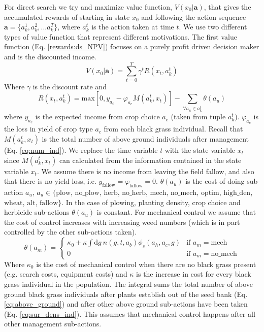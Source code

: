 \documentclass[12pt, a4paper]{article}
\begin{document}
For direct search we try and maximize value function, $V(x_0|\mathbf{a})$, that gives the accumulated rewards of starting in state $x_0$ and following the action sequence $\mathbf{a} = \{a_k^1, a_k^2, ... a_k^T\}$, where $a_k^t$ is the action taken at time $t$. We use two different types of value function that represent different motivations. The first value function (Eq. \ref{rewards:ds_NPV}) focuses on a purely profit driven decision maker and is the discounted income. 
\begin{equation}\label{rewards:ds_NPV}
	V(x_0|\mathbf{a}) = \sum_{t = 0}^{T} \gamma^t R(x_t, a_k^t) 
\end{equation}
Where $\gamma$ is the discount rate and 
\begin{equation}\label{rewards:immediate}
	R(x_t, a_k^t) = \text{max}\left[0, y_{a_c} - \varphi_{a_c} M(a_k^t, x_t)\right] - \sum_{\forall a_u \in a_k^t} \theta(a_u)  
\end{equation}
where $y_{a_c}$ is the expected income from crop choice $a_c$ (taken from tuple $a_k^t$). $\varphi_{a_c}$ is the loss in yield of crop type $a_c$ from each black grass individual. Recall that $M(a_k^t, x_t)$ is the total number of above ground individuals after management (Eq. \ref{eq:num_ind}). We replace the time variable $t$ with the state variable $x_t$ since $M(a_k^t, x_t)$ can calculated from the information contained in the state variable $x_t$. We assume there is no income from leaving the field fallow, and also that there is no yield loss, i.e. $y_\text{fallow} = \varphi_\text{fallow} = 0$. $\theta(a_u)$ is the cost of doing sub-action $a_u$, $a_u \in \{\text{plow}$, $\text{no\_plow}$, $\text{herb}$, $\text{no\_herb}$, $\text{mech}$, $\text{no\_mech}$, $\text{optim}$, $\text{high\_den}$, $\text{wheat}$, $\text{alt}$, $\text{fallow}\}$. In the case of plowing, planting density, crop choice and herbicide sub-actions $\theta(a_u)$ is constant. For mechanical control we assume that the cost of control increases with increasing weed numbers (which is in part controlled by the other sub-actions taken).
\begin{equation}\label{eq:cost_mech}
	\theta(a_m) = \begin{cases}
	\kappa_0 + \kappa \int \text{d}g~ n(g, t, a_b)\phi_s(a_h, a_c, g) &\text{if } a_m = \text{mech}\\
	0 &\text{if } a_m = \text{no\_mech}
	\end{cases} 
\end{equation}    
Where $\kappa_0$ is the cost of mechanical control when there are no black grass present (e.g. search costs, equipment costs) and $\kappa$ is the increase in cost for every black grass individual in the population. The integral sums the total number of above ground black grass individuals after plants establish out of the seed bank (Eq. \ref{eq:above_ground}) and after other above ground sub-actions have been taken (Eq. \ref{eq:sur_dens_ind}). This assumes that mechanical control happens after all other management sub-actions. 
\end{document}

